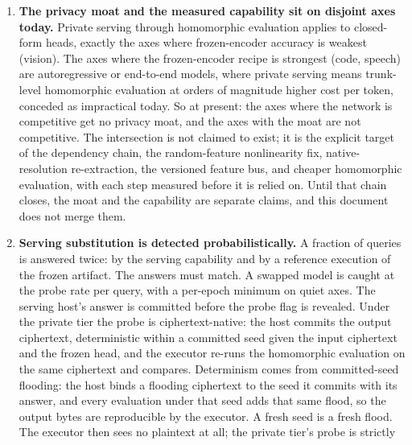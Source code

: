 \documentclass[11pt]{article}
\begin{document}
\begin{enumerate}
          fresh inputs, is exactly the case only fresh-input probing
          catches, and for weights-private artifacts it is bounded by the
          per-axis bond and the dispute path, not by detection. That
          residual is priced, not hidden.
    \item \textbf{The privacy moat and the measured capability sit on
              disjoint axes today.} Private serving through homomorphic
          evaluation applies to closed-form heads, exactly the axes
          where frozen-encoder accuracy is weakest (vision). The axes where
          the frozen-encoder recipe is strongest (code, speech) are
          autoregressive or end-to-end models, where private serving means
          trunk-level homomorphic evaluation at orders of magnitude higher
          cost per token, conceded as impractical today. So at present:
          the axes where the network is competitive get no privacy moat,
          and the axes with the moat are not competitive. The intersection
          is not claimed to exist; it is the explicit target of the
          dependency chain, the random-feature nonlinearity fix,
          native-resolution re-extraction, the versioned feature bus, and
          cheaper homomorphic evaluation, with each step measured before it
          is relied on. Until that chain closes, the moat and
          the capability are separate claims, and this document does not
          merge them.
    \item \textbf{Serving substitution is detected probabilistically.} A
          fraction of queries is answered twice: by the serving capability
          and by a reference execution of the frozen artifact. The answers
          must match. A swapped model is caught at the probe rate per
          query, with a per-epoch minimum on quiet axes. The serving host's
          answer is committed before the probe flag is revealed. Under the
          private tier the probe is ciphertext-native: the host commits the
          output ciphertext, deterministic within a committed seed given
          the input ciphertext and the frozen head, and the executor
          re-runs the homomorphic evaluation on the same ciphertext and
          compares. Determinism comes from committed-seed flooding: the
          host binds a flooding ciphertext to the seed it commits with its
          answer, and every evaluation under that seed adds that same
          flood, so the output bytes are reproducible by the executor. A
          fresh seed is a fresh flood. The executor then
          sees no plaintext at all; the private tier's probe is strictly

\end{enumerate}
\end{document}
